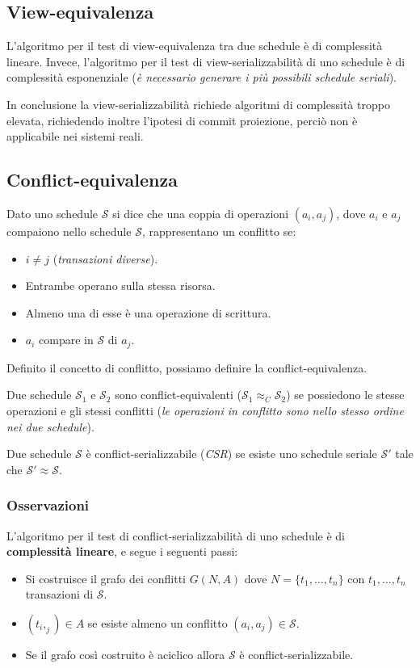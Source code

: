 \documentclass[oneside,a4paper,11pt]{book}
\theoremstyle{italicstyle}
\theoremstyle{normStyle}
\begin{document}
\subsection{View-equivalenza}
L'algoritmo per il test di view-equivalenza tra due schedule è di complessità 
lineare. Invece, l'algoritmo per il test di view-serializzabilità di uno schedule 
è di complessità esponenziale (\textit{è necessario generare i più possibili 
schedule seriali}).

In conclusione la view-serializzabilità richiede algoritmi di complessità 
troppo elevata, richiedendo inoltre l'ipotesi di commit proiezione, perciò 
non è applicabile nei sistemi reali.
\subsection{Conflict-equivalenza}
\begin{tcolorbox}[title = {Conflitto}]
  Dato uno schedule $\mathcal{S}$ si dice che una coppia di operazioni $(a_i,a_j)$, dove 
  $a_i$ e $a_j$ compaiono nello schedule $\mathcal{S}$, rappresentano un conflitto se:
  \begin{itemize}
    \item $i \not = j$ (\textit{transazioni diverse}).
    \item Entrambe operano sulla stessa risorsa.
    \item Almeno una di esse è una operazione di scrittura.
    \item $a_i$  compare in $\mathcal{S}$ di $a_j$.
  \end{itemize}
\end{tcolorbox}
Definito il concetto di conflitto, possiamo definire la conflict-equivalenza.
\begin{tcolorbox}[title = {Conflict-equivalenza}]
  Due schedule $\mathcal{S}_1$ e $\mathcal{S}_2$ sono conflict-equivalenti 
  ($\mathcal{S}_1 \approx_C \mathcal{S}_2$) se possiedono le stesse operazioni e gli stessi conflitti 
  (\textit{le operazioni in conflitto sono nello stesso ordine nei due schedule}).
\end{tcolorbox}
\begin{tcolorbox}[title = {Conflict-serializzabilità}]
  Due schedule $\mathcal{S}$ è conflict-serializzabile (\textit{CSR}) se esiste 
  uno schedule seriale $\mathcal{S}'$ tale che $\mathcal{S}' \approx \mathcal{S}$.
\end{tcolorbox}
\subsubsection{Osservazioni}
L'algoritmo per il test di conflict-serializzabilità di uno schedule è di 
\textbf{complessità lineare}, e segue i seguenti passi:
\begin{itemize}
  \item Si costruisce il grafo dei conflitti $G(N,A)$ dove 
  $N=\{t_1,\dots,t_n\}$ con $t_1,\dots,t_n$ transazioni di $\mathcal{S}$.
  \item $(t_i,_j)\in A$ se esiste almeno un conflitto $(a_i,a_j) \in \mathcal{S}$.
  \item Se il grafo così costruito è aciclico allora $\mathcal{S}$ è conflict-serializzabile.
\end{itemize}
\end{document}
